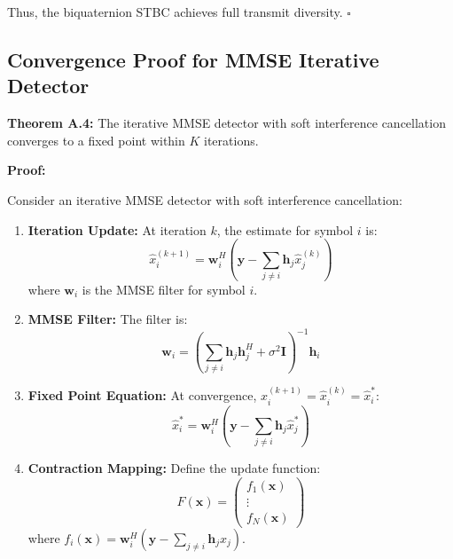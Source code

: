 Thus, the biquaternion STBC achieves full transmit diversity. $\square$

\subsection{Convergence Proof for MMSE Iterative Detector}

\textbf{Theorem A.4:} The iterative MMSE detector with soft interference cancellation converges to a fixed point within $K$ iterations.

\textbf{Proof:}

Consider an iterative MMSE detector with soft interference cancellation:

\begin{enumerate}
    \item \textbf{Iteration Update:} At iteration $k$, the estimate for symbol $i$ is:
    \begin{equation}
    \hat{x}_i^{(k+1)} = \mathbf{w}_i^H \left(\mathbf{y} - \sum_{j \neq i} \mathbf{h}_j \hat{x}_j^{(k)}\right)
    \end{equation}
    where $\mathbf{w}_i$ is the MMSE filter for symbol $i$.
    
    \item \textbf{MMSE Filter:} The filter is:
    \begin{equation}
    \mathbf{w}_i = \left(\sum_{j \neq i} \mathbf{h}_j \mathbf{h}_j^H + \sigma^2 \mathbf{I}\right)^{-1} \mathbf{h}_i
    \end{equation}
    
    \item \textbf{Fixed Point Equation:} At convergence, $\hat{x}_i^{(k+1)} = \hat{x}_i^{(k)} = \hat{x}_i^*$:
    \begin{equation}
    \hat{x}_i^* = \mathbf{w}_i^H \left(\mathbf{y} - \sum_{j \neq i} \mathbf{h}_j \hat{x}_j^*\right)
    \end{equation}
    
    \item \textbf{Contraction Mapping:} Define the update function:
    \begin{equation}
    F(\mathbf{x}) = \begin{pmatrix}
    f_1(\mathbf{x}) \\
    \vdots \\
    f_N(\mathbf{x})
    \end{pmatrix}
    \end{equation}
    where $f_i(\mathbf{x}) = \mathbf{w}_i^H(\mathbf{y} - \sum_{j \neq i} \mathbf{h}_j x_j)$.
    

\end{enumerate}
